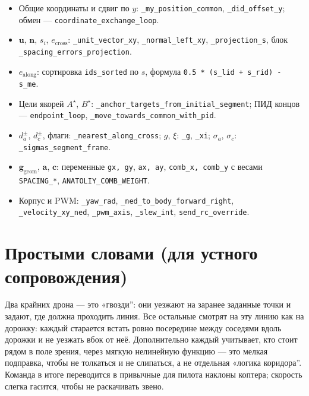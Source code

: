 \documentclass[12pt,a4paper]{article}
\begin{document}
\begin{itemize}
  \item Общие координаты и сдвиг по $y$: \texttt{\_my\_position\_common}, \texttt{\_did\_offset\_y}; обмен --- \texttt{coordinate\_exchange\_loop}.
  \item $\mathbf{u}$, $\mathbf{n}$, $s_i$, $e_{\mathrm{cross}}$: \texttt{\_unit\_vector\_xy}, \texttt{\_normal\_left\_xy}, \texttt{\_projection\_s}, блок \texttt{\_spacing\_errors\_projection}.
  \item $e_{\mathrm{along}}$: сортировка \texttt{ids\_sorted} по $s$, формула \texttt{0.5 * (s\_lid + s\_rid) - s\_me}.
  \item Цели якорей $A^\star$, $B^\star$: \texttt{\_anchor\_targets\_from\_initial\_segment}; ПИД концов --- \texttt{endpoint\_loop}, \texttt{\_move\_towards\_common\_with\_pid}.
  \item $d_a^\pm$, $d_c^\pm$, флаги: \texttt{\_nearest\_along\_cross}; $g$, $\xi$: \texttt{\_g}, \texttt{\_xi}; $\sigma_a$, $\sigma_c$: \texttt{\_sigmas\_segment\_frame}.
  \item $\mathbf{g}_{\mathrm{geom}}$, $\mathbf{a}$, $\mathbf{c}$: переменные \texttt{gx, gy}, \texttt{ax, ay}, \texttt{comb\_x, comb\_y} с весами \texttt{SPACING\_*}, \texttt{ANATOLIY\_COMB\_WEIGHT}.
  \item Корпус и PWM: \texttt{\_yaw\_rad}, \texttt{\_ned\_to\_body\_forward\_right}, \texttt{\_velocity\_xy\_ned}, \texttt{\_pwm\_axis}, \texttt{\_slew\_int}, \texttt{send\_rc\_override}.
\end{itemize}

\section*{Простыми словами (для устного сопровождения)}

Два крайних дрона --- это «гвозди'': они уезжают на заранее заданные точки и задают, где должна проходить линия. Все остальные смотрят на эту линию как на дорожку: каждый старается встать ровно посередине между соседями вдоль дорожки и не уезжать вбок от неё. Дополнительно каждый учитывает, кто стоит рядом в поле зрения, через мягкую нелинейную функцию --- это мелкая подправка, чтобы не толкаться и не слипаться, а не отдельная «логика коридора''. Команда в итоге переводится в привычные для пилота наклоны коптера; скорость слегка гасится, чтобы не раскачивать звено.
\end{document}
